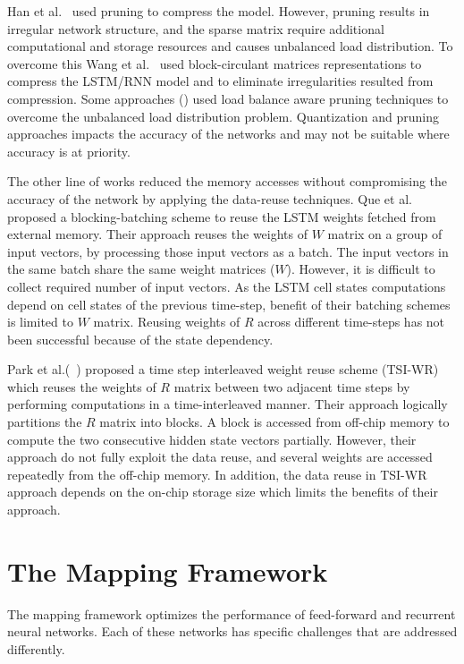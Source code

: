 \documentclass[a4paper,10pt]{article}
\begin{document}
Han et al.~\cite{han2017ese} used pruning to compress the model. However, pruning results in irregular network structure, and the sparse matrix require additional computational and storage resources and causes unbalanced load distribution. To overcome this Wang et al.~\cite{wang2018c} used block-circulant matrices representations to compress the LSTM/RNN model and to eliminate irregularities resulted from compression. Some approaches (\cite{park2019balancing,han2017ese,park2018maximizing}) used load balance aware pruning techniques to overcome the unbalanced load distribution problem. Quantization and pruning approaches impacts the accuracy of the networks and may not be suitable where accuracy is at priority. 

The other line of works reduced the memory accesses without compromising the accuracy of the network by applying the data-reuse techniques. Que et al.~\cite{que2019efficient} proposed a blocking-batching scheme to reuse the LSTM weights fetched from external memory. Their approach reuses the weights of $W$ matrix on a group of input vectors, by processing those input vectors as a batch. The input vectors in the same batch share the same weight matrices ($W$). However, it is difficult to collect required number of input vectors. As the LSTM cell states computations depend on cell states of the previous time-step, benefit of their batching schemes is limited to $W$ matrix. Reusing weights of $R$ across different time-steps has not been successful because of the state dependency.

Park et al.(~\cite{park2020time}) proposed a time step interleaved weight reuse scheme (TSI-WR) which reuses the weights of $R$ matrix between two adjacent time steps by performing computations in a time-interleaved manner. Their approach logically partitions the $R$ matrix into blocks. A block is accessed from off-chip memory to compute the two consecutive hidden state vectors partially. However, their approach do not fully exploit the data reuse, and several weights are accessed repeatedly from the off-chip memory. In addition, the data reuse in TSI-WR approach depends on the on-chip storage size which limits the benefits of their approach.

\section{The Mapping Framework}
The mapping framework optimizes the performance of feed-forward and recurrent neural networks. Each of these networks has specific challenges that are addressed differently. 
\end{document}
